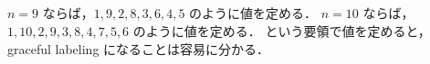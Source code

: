 \subsection{}
$n=9$ ならば，$1,9,2,8,3,6,4,5$ のように値を定める．
$n=10$ ならば，$1,10,2,9,3,8,4,7,5,6$ のように値を定める．
という要領で値を定めると，graceful labeling になることは容易に分かる．